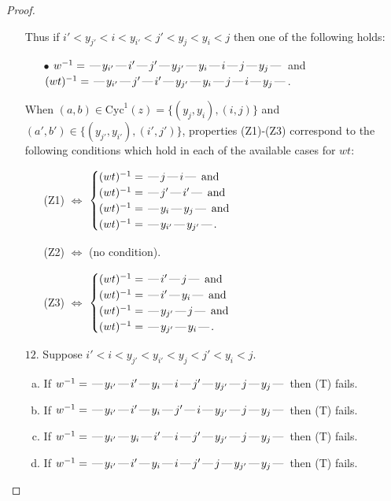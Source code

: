 \documentclass[10pt]{article}
\theoremstyle{definition}
\theoremstyle{definition}
\def\dash{\text{\hspace{0.5mm}---\hspace{0.5mm}}}
\def\Cyc{\mathrm{Cyc}}
\begin{document}
\begin{proof}
\begin{enumerate}
\begin{enumerate}[(a)]
\end{enumerate}
Thus if $i' < y_{j'} < i < y_{i'} < j' < y_j < y_i < j$ then one of the following holds:
\begin{enumerate}
\item[$\bullet$] $w^{-1} = \dash y_{i'}\dash i'\dash j'\dash y_{j'}\dash y_i\dash i\dash j\dash y_j\dash $ and $(wt)^{-1} = \dash y_{i'}\dash j'\dash i'\dash y_{j'}\dash y_i\dash j\dash i\dash y_j\dash $.
\end{enumerate}
When $(a,b)\in\Cyc^1(z)=\{(y_j,y_i),(i,j)\}$ and $(a',b')\in\{(y_{j'},y_{i'}),(i',j')\}$,
properties (Z1)-(Z3) correspond to the following conditions which
hold in each of the available cases for $wt$:
\begin{enumerate}
\item[](Z1) $\Leftrightarrow$ $\begin{cases}\text{$(wt)^{-1} = \dash j \dash i \dash$}\text{ and }\\
\text{$(wt)^{-1} = \dash j' \dash i' \dash$}\text{ and }\\
\text{$(wt)^{-1} = \dash y_i \dash y_j \dash$}\text{ and }\\
\text{$(wt)^{-1} = \dash y_{i'} \dash y_{j'} \dash$}.\end{cases}$
\item[](Z2) $\Leftrightarrow$ (no condition).
\item[](Z3) $\Leftrightarrow$ $\begin{cases}\text{$(wt)^{-1} = \dash i' \dash j \dash$}\text{ and }\\
\text{$(wt)^{-1} = \dash i' \dash y_i \dash$}\text{ and }\\
\text{$(wt)^{-1} = \dash y_{j'} \dash j \dash$}\text{ and }\\
\text{$(wt)^{-1} = \dash y_{j'} \dash y_i \dash$}.\end{cases}$
\end{enumerate}
\item[$12$.] Suppose $i' < i < y_{j'} < y_{i'} < y_j < j' < y_i < j$.
\begin{enumerate}[(a)]
\item If $w^{-1} = \dash y_{i'}\dash i'\dash y_i\dash i\dash j'\dash y_{j'}\dash j\dash y_j\dash $ then (T) fails.
\item If $w^{-1} = \dash y_{i'}\dash i'\dash y_i\dash j'\dash i\dash y_{j'}\dash j\dash y_j\dash $ then (T) fails.
\item If $w^{-1} = \dash y_{i'}\dash y_i\dash i'\dash i\dash j'\dash y_{j'}\dash j\dash y_j\dash $ then (T) fails.
\item If $w^{-1} = \dash y_{i'}\dash i'\dash y_i\dash i\dash j'\dash j\dash y_{j'}\dash y_j\dash $ then (T) fails.

\end{enumerate}
\end{enumerate}
\end{proof}
\end{document}
